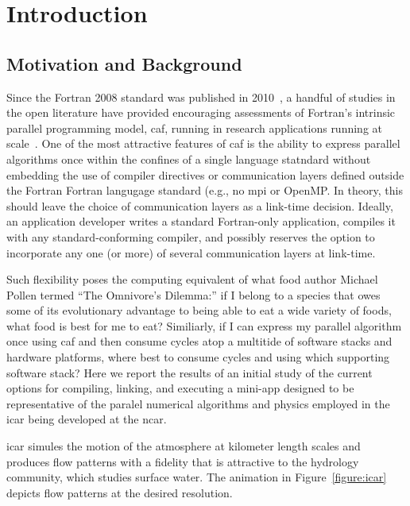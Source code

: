 \section{Introduction}
\subsection{Motivation and Background}
Since the Fortran 2008 standard was published in 2010~\cite{iso2010fortran}, a handful of studies in the open literature
have provided encouraging assessments of Fortran's intrinsic parallel programming model, \gls{caf}, running in research
applications running at scale~\cite{preissl2011multithreaded,garain2015comparing,mozdzynski2015partitioned}.   One of the
most attractive features of \gls{caf} is the ability to express parallel algorithms once within the confines of a single
language statndard without embedding the use of compiler directives or communication layers defined outside the Fortran
Fortran langugage standard (e.g., no \gls{mpi} or OpenMP.  In theory, this should leave the choice of communication layers
as a link-time decision.  Ideally, an application developer writes a standard Fortran-only application, compiles it with any
standard-conforming compiler, and possibly reserves the option to incorporate any one (or more) of several communication layers
at link-time.

Such flexibility poses the computing equivalent of what food author Michael Pollen termed ``The Omnivore's Dilemma:'' if I
belong to a species that owes some of its evolutionary advantage to being able to eat a wide variety of foods, what food is
best for me to eat?  Similiarly, if I can express my parallel algorithm once using \gls{caf} and then consume cycles atop a
multitide of software stacks and hardware platforms, where best to consume cycles and using which supporting software stack?
Here we report the results of an initial study of the current options for compiling, linking, and executing a \gls{mini-app}
designed to be representative of the paralel numerical algorithms and physics employed in the \gls{icar} being developed at
the \gls{ncar}.

\gls{icar} simules the motion of the atmosphere at kilometer length scales and produces flow patterns with a fidelity that is
attractive to the hydrology community, which studies surface water.  The animation in Figure~\ref{figure:icar} depicts flow
patterns at the desired resolution.

\begin{figure*}
  \centering
   \caption{An animation of atmospheric flow patterns simulated by the \href{https://github.com/gutmann/icar}{\gls{icar}}.
      Courtesy of Ethan Gutmann, NCAR.\label{figure:icar}}
\end{figure*}

